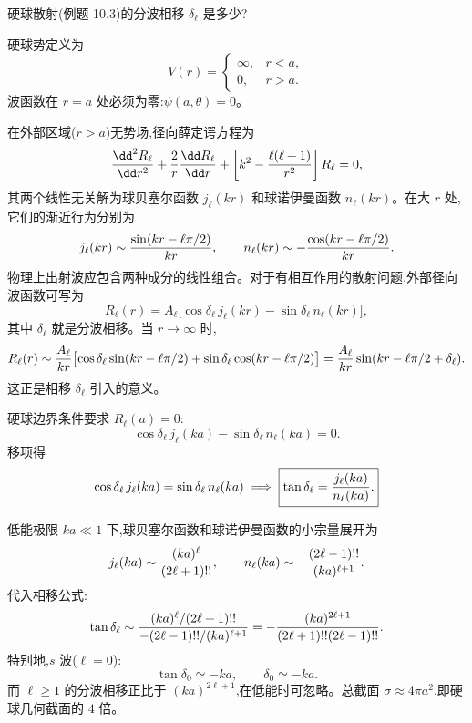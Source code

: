 \begin{question}
硬球散射(例题 10.3)的分波相移 $\delta_\ell$ 是多少?
\begin{solution}
硬球势定义为
\[
V(r)=\begin{cases}
\infty,& r<a,\\
0,& r>a.
\end{cases}
\]
波函数在 $r=a$ 处必须为零:$\psi(a,\theta)=0$。

在外部区域($r>a$)无势场,径向薛定谔方程为
\[
{\dd^2R_\ell\over\dd r^2}+{2\over r}{\dd R_\ell\over\dd r}+\left[k^2-{\ell(\ell+1)\over r^2}\right]R_\ell=0,
\]
其两个线性无关解为球贝塞尔函数 $j_\ell(kr)$ 和球诺伊曼函数 $n_\ell(kr)$。在大 $r$ 处,它们的渐近行为分别为
\[
j_\ell(kr)\sim{\sin(kr-\ell\pi/2)\over kr},\qquad
n_\ell(kr)\sim-{\cos(kr-\ell\pi/2)\over kr}.
\]
物理上出射波应包含两种成分的线性组合。对于有相互作用的散射问题,外部径向波函数可写为
\[
R_\ell(r)=A_\ell\bigl[\cos\delta_\ell\,j_\ell(kr)-\sin\delta_\ell\,n_\ell(kr)\bigr],
\]
其中 $\delta_\ell$ 就是分波相移。当 $r\to\infty$ 时,
\[
R_\ell(r)\sim{A_\ell\over kr}\bigl[\cos\delta_\ell\sin(kr-\ell\pi/2)+\sin\delta_\ell\cos(kr-\ell\pi/2)\bigr]
={A_\ell\over kr}\sin(kr-\ell\pi/2+\delta_\ell).
\]
这正是相移 $\delta_\ell$ 引入的意义。

硬球边界条件要求 $R_\ell(a)=0$:
\[
\cos\delta_\ell\,j_\ell(ka)-\sin\delta_\ell\,n_\ell(ka)=0.
\]
移项得
\[
\cos\delta_\ell\,j_\ell(ka)=\sin\delta_\ell\,n_\ell(ka)
\;\Longrightarrow\;
\boxed{\tan\delta_\ell={j_\ell(ka)\over n_\ell(ka)}.}
\]

低能极限 $ka\ll1$ 下,球贝塞尔函数和球诺伊曼函数的小宗量展开为
\[
j_\ell(ka)\sim{(ka)^\ell\over(2\ell+1)!!},\qquad
n_\ell(ka)\sim-{(2\ell-1)!!\over(ka)^{\ell+1}}.
\]
代入相移公式:
\[
\tan\delta_\ell\sim{(ka)^\ell/(2\ell+1)!!\over-(2\ell-1)!!/(ka)^{\ell+1}}
=-{(ka)^{2\ell+1}\over(2\ell+1)!!(2\ell-1)!!}.
\]
特别地,$s$ 波($\ell=0$):
\[
\tan\delta_0\simeq -ka,\qquad\boxed{\delta_0\simeq -ka.}
\]
而 $\ell\ge1$ 的分波相移正比于 $(ka)^{2\ell+1}$,在低能时可忽略。总截面 $\sigma\approx 4\pi a^2$,即硬球几何截面的 $4$ 倍。
\end{solution}
\end{question}

